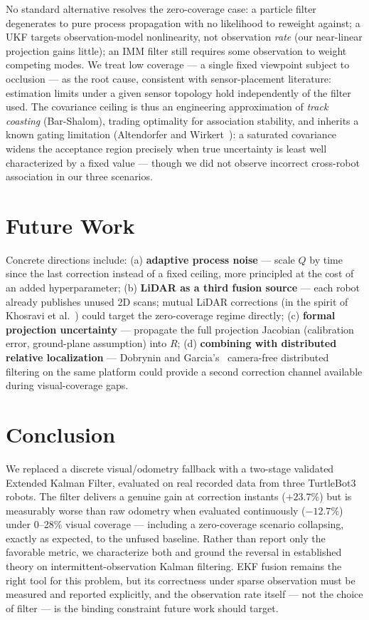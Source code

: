 \documentclass[runningheads]{llncs}
\begin{document}
No standard alternative resolves the zero-coverage case: a particle
filter degenerates to pure process propagation with no likelihood to
reweight against; a UKF targets observation-model nonlinearity, not
observation \emph{rate} (our near-linear projection gains little); an
IMM filter still requires some observation to weight competing modes.
We treat low coverage — a single fixed viewpoint subject to
occlusion — as the root cause, consistent with sensor-placement
literature: estimation limits under a given sensor topology hold
independently of the filter used. The covariance ceiling is thus an
engineering approximation of \emph{track coasting} (Bar-Shalom),
trading optimality for association stability, and inherits a known gating
limitation (Altendorfer and
Wirkert~\cite{altendorfer2016association}): a saturated covariance
widens the acceptance region precisely when true uncertainty is least
well characterized by a fixed value — though we did not observe
incorrect cross-robot association in our three scenarios.

\section{Future Work}
\label{sec:future-work}

Concrete directions include: (a) \textbf{adaptive process noise} — scale
$Q$ by time since the last correction instead of a fixed ceiling, more
principled at the cost of an added hyperparameter; (b) \textbf{LiDAR as
a third fusion source} — each robot already publishes unused 2D scans;
mutual LiDAR corrections (in the spirit of
Khosravi et al.~\cite{khosravi2026cooperative}) could target the
zero-coverage regime directly; (c) \textbf{formal projection
uncertainty} — propagate the full projection Jacobian (calibration
error, ground-plane assumption) into $R$; (d) \textbf{combining with
distributed relative localization} — Dobrynin and
Garcia's~\cite{dobrynin2025turtlebot} camera-free distributed filtering
on the same platform could provide a second correction channel
available during visual-coverage gaps.

\section{Conclusion}

We replaced a discrete visual/odometry fallback with a two-stage
validated Extended Kalman Filter, evaluated on real recorded data from
three TurtleBot3 robots. The filter delivers a genuine gain at
correction instants ($+23.7\%$) but is measurably worse than raw
odometry when evaluated continuously ($-12.7\%$) under 0--28\% visual
coverage — including a zero-coverage scenario collapsing, exactly as
expected, to the unfused baseline. Rather than report only the
favorable metric, we characterize both and ground the reversal in
established theory on intermittent-observation Kalman filtering. EKF
fusion remains the right tool for this problem, but its correctness
under sparse observation must be measured and reported explicitly, and
the observation rate itself — not the choice of filter — is the binding
constraint future work should target.
\end{document}
